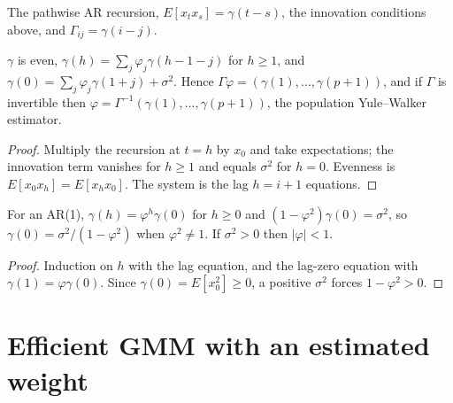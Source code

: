 \begin{definition}
\label{def:yule-walker}
\leanok
The pathwise AR recursion, $E[x_tx_s] = \gamma(t-s)$, the innovation conditions above, and $\Gamma_{ij} = \gamma(i-j)$.
\end{definition}

\begin{theorem}
\label{thm:yule-walker}
\leanok
{}
$\gamma$ is even, $\gamma(h) = \sum_j\varphi_j\gamma(h-1-j)$ for $h\ge1$, and $\gamma(0) = \sum_j\varphi_j\gamma(1+j)+\sigma^2$.
Hence $\Gamma\varphi = (\gamma(1),\dots,\gamma(p+1))$, and if $\Gamma$ is invertible then
$\varphi = \Gamma^{-1}(\gamma(1),\dots,\gamma(p+1))$, the population Yule--Walker estimator.
\end{theorem}
\begin{proof}
\leanok
Multiply the recursion at $t = h$ by $x_0$ and take expectations; the innovation term vanishes for $h\ge1$ and equals
$\sigma^2$ for $h = 0$. Evenness is $E[x_0x_h] = E[x_hx_0]$. The system is the lag $h = i+1$ equations.
\end{proof}

\begin{theorem}[AR(1) autocovariances]
\label{thm:ar1-autocov}
\leanok
{}
For an AR(1), $\gamma(h) = \varphi^h\gamma(0)$ for $h\ge0$ and $(1-\varphi^2)\gamma(0) = \sigma^2$, so
$\gamma(0) = \sigma^2/(1-\varphi^2)$ when $\varphi^2\ne1$. If $\sigma^2 > 0$ then $|\varphi| < 1$.
\end{theorem}
\begin{proof}
\leanok
Induction on $h$ with the lag equation, and the lag-zero equation with $\gamma(1) = \varphi\gamma(0)$. Since
$\gamma(0) = E[x_0^2]\ge0$, a positive $\sigma^2$ forces $1-\varphi^2 > 0$.
\end{proof}

\section{Efficient GMM with an estimated weight}
\label{sec:two-step-gmm}

